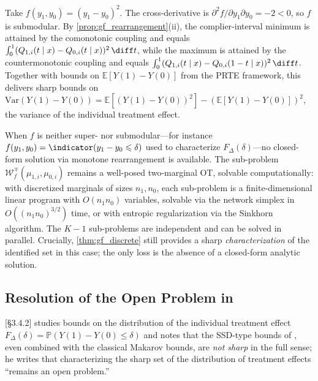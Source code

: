 \begin{example}\label{ex:gf_var}
    Take $f(y_1, y_0) = (y_1 - y_0)^2$. The cross-derivative is $\partial^2 f / \partial y_1 \partial y_0 = -2 < 0$, so $f$ is submodular. By \cref{prop:gf_rearrangement}(ii), the complier-interval minimum is attained by the comonotonic coupling and equals $\int_0^1 (Q_{1,i}(t \mid x) - Q_{0,i}(t \mid x))^2\, \diff t$, while the maximum is attained by the countermonotonic coupling and equals $\int_0^1 (Q_{1,i}(t \mid x) - Q_{0,i}(1 - t \mid x))^2\, \diff t$. Together with bounds on $\mathbb{E}[Y(1) - Y(0)]$ from the PRTE framework, this delivers sharp bounds on $\mathrm{Var}(Y(1) - Y(0)) = \mathbb{E}[(Y(1) - Y(0))^2] - (\mathbb{E}[Y(1) - Y(0)])^2$, the variance of the individual treatment effect.
\end{example}

\begin{remark}\label{rmk:gf_general_cost}
    When $f$ is neither super- nor submodular---for instance $f(y_1, y_0) = \indicator(y_1 - y_0 \leqslant \delta)$ used to characterize $F_\Delta(\delta)$---no closed-form solution via monotone rearrangement is available. The sub-problem $\mathcal{W}_f^\mp(\mu_{1,i}, \mu_{0,i})$ remains a well-posed two-marginal OT, solvable computationally: with discretized marginals of sizes $n_1, n_0$, each sub-problem is a finite-dimensional linear program with $O(n_1 n_0)$ variables, solvable via the network simplex in $O((n_1 n_0)^{3/2})$ time, or with entropic regularization via the Sinkhorn algorithm. The $K-1$ sub-problems are independent and can be solved in parallel. Crucially, \cref{thm:gf_discrete} still provides a sharp \emph{characterization} of the identified set in this case; the only loss is the absence of a closed-form analytic solution.
\end{remark}

\subsection{Resolution of the Open Problem in \texorpdfstring{\citet{marx2024sharp}}{Marx (2024)}}\label{subsec:gf_marx}

\citet{marx2024sharp}[\S 3.4.2] studies bounds on the distribution of the individual treatment effect $F_\Delta(\delta) = \mathbb{P}(Y(1) - Y(0) \leqslant \delta)$ and notes that the SSD-type bounds of \citet{fan_park2010sharp}, even combined with the classical Makarov bounds, are \emph{not sharp} in the full sense; he writes that characterizing the sharp set of the distribution of treatment effects ``remains an open problem.''

